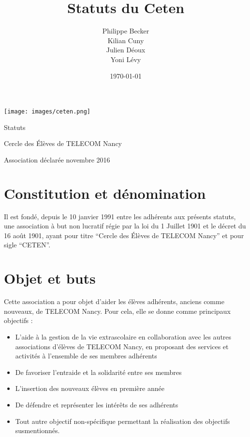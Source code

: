 \documentclass{article}
\title{Statuts du Ceten}
\author{Philippe Becker\\
	Kilian Cuny\\
	Julien Déoux\\
	Yoni Lévy} %
\date\today
\begin{document}

	
	\begin{titlepage}
		\begin{center}
			\texttt{[image: images/ceten.png]}\par
			\vspace{3cm}
			{\Huge \light Statuts}\par
			\vfill
			{\large Cercle des Élèves de TELECOM Nancy}\par
			{\large \light Association déclarée}
			\vfill
			{ novembre 2016}\par
		\end{center}
	\end{titlepage}

	



	\section{Constitution et dénomination}
		Il est fondé, depuis le 10 janvier 1991 entre les adhérents aux présents
		statuts, une association à but non lucratif régie par la loi du 1
		Juillet 1901 et le décret du 16 août 1901, ayant pour titre “Cercle des
		Élèves de TELECOM Nancy” et pour sigle “CETEN”.

	\section{Objet et buts}
	\label{sec:objet}
		Cette association a pour objet d’aider les élèves adhérents, anciens
		comme nouveaux, de TELECOM Nancy. Pour cela, elle se donne comme
		principaux objectifs :
		\begin{itemize}
			\item L’aide à la gestion de la vie extrascolaire en collaboration
				avec les autres associations d'élèves de TELECOM Nancy, en
				proposant des services et activités à l’ensemble de ses membres
				adhérents
			\item De favoriser l’entraide et la solidarité entre ses membres
			\item L’insertion des nouveaux élèves en première année
			\item De défendre et représenter les intérêts de ses adhérents
			\item Tout autre objectif non-spécifique permettant la réalisation
				des objectifs susmentionnés.
		\end{itemize}
\end{document}
